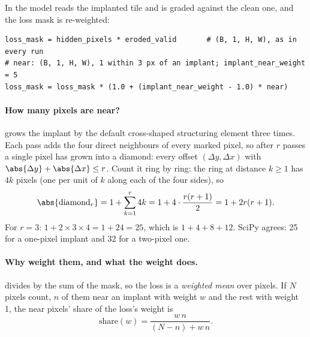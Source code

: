 In  the model reads the implanted tile and is graded against the clean one, and the loss mask is
re-weighted:

\begin{lstlisting}
loss_mask = hidden_pixels * eroded_valid       # (B, 1, H, W), as in every run
# near: (B, 1, H, W), 1 within 3 px of an implant; implant_near_weight = 5
loss_mask = loss_mask * (1.0 + (implant_near_weight - 1.0) * near)
\end{lstlisting}

\paragraph{How many pixels are near?} 
 grows the implant by the default cross-shaped structuring element three
times. Each pass adds the four direct neighbours of every marked pixel, so after $r$ passes a single pixel has grown
into a diamond: every offset $(\Delta y, \Delta x)$ with $\abs{\Delta y} + \abs{\Delta x} \le r$. Count it ring by
ring: the ring at distance $k \ge 1$ has $4k$ pixels (one per unit of $k$ along each of the four sides), so
\begin{equation}
\abs{\text{diamond}_r} = 1 + \sum_{k=1}^{r} 4k = 1 + 4 \cdot \frac{r(r+1)}{2} = 1 + 2r(r + 1). \label{eq:ftruns:diamond}
\end{equation}
For $r = 3$: $1 + 2 \times 3 \times 4 = 1 + 24 = 25$, which is $1 + 4 + 8 + 12$. SciPy agrees: 25 for a one-pixel
implant and 32 for a two-pixel one\tagC.

\paragraph{Why weight them, and what the weight does.} 
 divides by the sum of the mask, so the loss is a \emph{weighted mean} over pixels. If $N$ pixels
count, $n$ of them near an implant with weight $w$ and the rest with weight 1, the near pixels' share of the loss's
weight is
\begin{equation}
\text{share}(w) = \frac{w\,n}{(N - n) + w\,n}. \label{eq:ftruns:share}
\end{equation}

